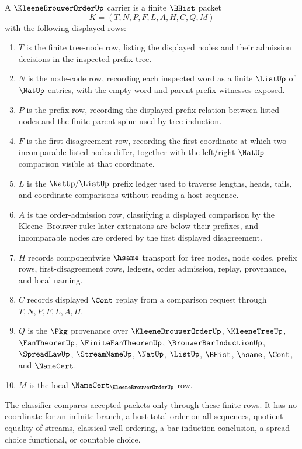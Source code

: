 \begin{definition}
\label{def:kleene-brouwer-order-carrier}
A $\KleeneBrouwerOrderUp$ carrier is a finite $\BHist$ packet
$$
K=(T,N,P,F,L,A,H,C,Q,M)
$$
with the following displayed rows:
\begin{enumerate}
\item $T$ is the finite tree-node row, listing the displayed nodes and their admission decisions in the inspected prefix tree.
\item $N$ is the node-code row, recording each inspected word as a finite $\ListUp$ of $\NatUp$ entries, with the empty word and parent-prefix witnesses exposed.
\item $P$ is the prefix row, recording the displayed prefix relation between listed nodes and the finite parent spine used by tree induction.
\item $F$ is the first-disagreement row, recording the first coordinate at which two incomparable listed nodes differ, together with the left/right $\NatUp$ comparison visible at that coordinate.
\item $L$ is the $\NatUp/\ListUp$ prefix ledger used to traverse lengths, heads, tails, and coordinate comparisons without reading a host sequence.
\item $A$ is the order-admission row, classifying a displayed comparison by the Kleene--Brouwer rule: later extensions are below their prefixes, and incomparable nodes are ordered by the first displayed disagreement.
\item $H$ records componentwise $\hsame$ transport for tree nodes, node codes, prefix rows, first-disagreement rows, ledgers, order admission, replay, provenance, and local naming.
\item $C$ records displayed $\Cont$ replay from a comparison request through $T,N,P,F,L,A,H$.
\item $Q$ is the $\Pkg$ provenance over $\KleeneBrouwerOrderUp$, $\KleeneTreeUp$, $\FanTheoremUp$, $\FiniteFanTheoremUp$, $\BrouwerBarInductionUp$, $\SpreadLawUp$, $\StreamNameUp$, $\NatUp$, $\ListUp$, $\BHist$, $\hsame$, $\Cont$, and $\NameCert$.
\item $M$ is the local $\NameCert_{\KleeneBrouwerOrderUp}$ row.
\end{enumerate}
The classifier compares accepted packets only through these finite rows. It has no coordinate for an infinite branch, a host total order on all sequences, quotient equality of streams, classical well-ordering, a bar-induction conclusion, a spread choice functional, or countable choice.
\end{definition}

